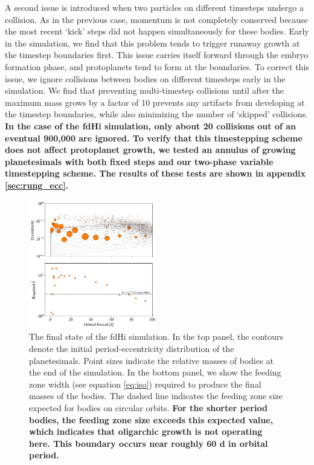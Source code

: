 \documentclass[twocolumn,linenumbers]{aastex63}
\begin{document}
A second issue is introduced when two particles on different timesteps
undergo a collision. As in the previous case, momentum is not
completely conserved because the most recent `kick' steps did not
happen simultaneously for these bodies. Early in the simulation, we
find that this problem tends to trigger runaway growth at the timestep
boundaries first. This issue carries itself forward through the embryo
formation phase, and protoplanets tend to form at the boundaries. To
correct this issue, we ignore collisions between bodies on different
timesteps early in the simulation. We find that preventing
multi-timestep collisions until after the maximum mass grows by a
factor of 10 prevents any artifacts from developing at the timestep
boundaries, while also minimizing the number of `skipped' collisions. \textbf{In the case of the fdHi simulation, only about 20 collisions out of an eventual 900,000 are ignored. To verify that this timestepping scheme does not affect protoplanet growth, we tested an annulus of growing planetesimals with both fixed steps and our two-phase variable timestepping scheme. The results of these tests are shown in appendix \ref{sec:rung_ecc}.}

\begin{figure}
\begin{center}
    \includegraphics[width=0.5\textwidth]{figures/fulldisk_e_m_b.png}
    \caption{The final state of the fdHi simulation. In the top panel,
      the contours denote the initial period-eccentricity distribution
      of the planetesimals. Point sizes indicate the relative masses
      of bodies at the end of the simulation. In the bottom panel, we show the
      feeding zone width (see equation \ref{eq:iso}) required to produce
      the final masses of the bodies. The dashed line indicates the feeding
      zone size expected for bodies on circular orbits. \textbf{For the shorter period bodies,
      the feeding zone size exceeds this expected value, which indicates that oligarchic growth is
      not operating here. This boundary occurs near roughly 60 d in orbital period.}\label{fig:fulldisk_e_m}}
\end{center}
\end{figure}
\end{document}
